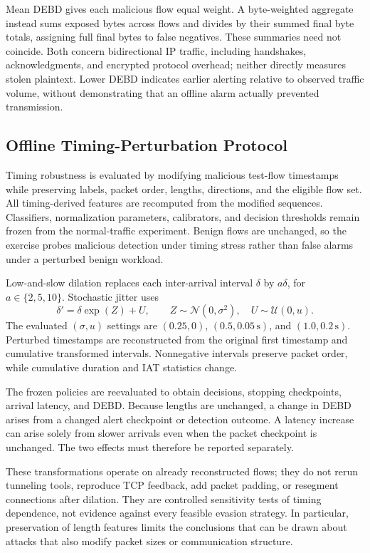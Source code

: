 \documentclass[conference]{IEEEtran}
\begin{document}
Mean DEBD gives each malicious flow equal weight. A byte-weighted aggregate instead sums exposed bytes across flows and divides by their summed final byte totals, assigning full final bytes to false negatives. These summaries need not coincide. Both concern bidirectional IP traffic, including handshakes, acknowledgments, and encrypted protocol overhead; neither directly measures stolen plaintext. Lower DEBD indicates earlier alerting relative to observed traffic volume, without demonstrating that an offline alarm actually prevented transmission.

\subsection{Offline Timing-Perturbation Protocol}
Timing robustness is evaluated by modifying malicious test-flow timestamps while preserving labels, packet order, lengths, directions, and the eligible flow set. All timing-derived features are recomputed from the modified sequences. Classifiers, normalization parameters, calibrators, and decision thresholds remain frozen from the normal-traffic experiment. Benign flows are unchanged, so the exercise probes malicious detection under timing stress rather than false alarms under a perturbed benign workload.

Low-and-slow dilation replaces each inter-arrival interval $\delta$ by $a\delta$, for $a\in\{2,5,10\}$. Stochastic jitter uses
\begin{equation}
\delta'=\delta\exp(Z)+U,\qquad
Z\sim\mathcal{N}(0,\sigma^2),\quad
U\sim\mathcal{U}(0,u).
\label{eq:jitter}
\end{equation}
The evaluated $(\sigma,u)$ settings are $(0.25,0)$, $(0.5,0.05\,\mathrm{s})$, and $(1.0,0.2\,\mathrm{s})$. Perturbed timestamps are reconstructed from the original first timestamp and cumulative transformed intervals. Nonnegative intervals preserve packet order, while cumulative duration and IAT statistics change.

The frozen policies are reevaluated to obtain decisions, stopping checkpoints, arrival latency, and DEBD. Because lengths are unchanged, a change in DEBD arises from a changed alert checkpoint or detection outcome. A latency increase can arise solely from slower arrivals even when the packet checkpoint is unchanged. The two effects must therefore be reported separately.

These transformations operate on already reconstructed flows; they do not rerun tunneling tools, reproduce TCP feedback, add packet padding, or resegment connections after dilation. They are controlled sensitivity tests of timing dependence, not evidence against every feasible evasion strategy. In particular, preservation of length features limits the conclusions that can be drawn about attacks that also modify packet sizes or communication structure.
\end{document}
